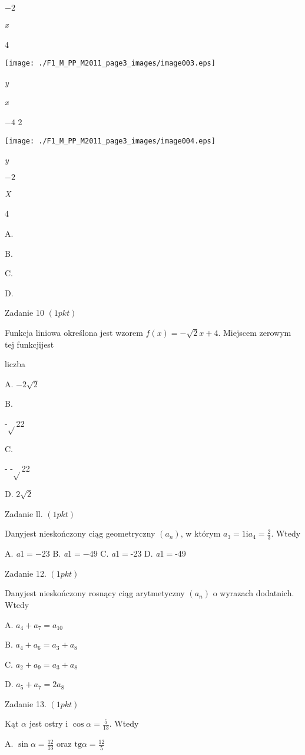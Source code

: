 \documentclass[a4paper,12pt]{article}
\begin{document}
$-2$

{\it x}

4
\begin{center}
\texttt{[image: ./F1\_M\_PP\_M2011\_page3\_images/image003.eps]}
\end{center}
{\it y}

{\it x}

$-4$  2
\begin{center}
\texttt{[image: ./F1\_M\_PP\_M2011\_page3\_images/image004.eps]}
\end{center}
{\it y}

$-2$

{\it X}

4

A.

B.

C.

D.

Zadanie 10 $(1pkt)$

Funkcja liniowa określona jest wzorem $f(x)=-\sqrt{2}x+4$. Miejscem zerowym tej funkcjijest

liczba

A. $-2\sqrt{2}$

B.

-$\sqrt{}$22

C.

- -$\sqrt{}$22

D. $2\sqrt{2}$

Zadanie ll. $(1pkt)$

Danyjest nieskończony ciąg geometryczny $(a_{n})$, w którym $a_{3}=1 \displaystyle \mathrm{i}a_{4}=\frac{2}{3}$. Wtedy

A. {\it a}1$=- 23$ B. {\it a}1$=- 49$ C. {\it a}1$=$-23 D. {\it a}1$=$-49

Zadanie 12. $(1pkt)$

Danyjest nieskończony rosnący ciąg arytmetyczny $(a_{n})$ o wyrazach dodatnich. Wtedy

A. $a_{4}+a_{7}=a_{10}$

B. $a_{4}+a_{6}=a_{3}+a_{8}$

C. $a_{2}+a_{9}=a_{3}+a_{8}$

D. $a_{5}+a_{7}=2a_{8}$

Zadanie 13. $(1pkt)$

Kąt $\alpha$ jest ostry i $\displaystyle \cos\alpha=\frac{5}{13}$. Wtedy

A. $\displaystyle \sin\alpha=\frac{12}{13}$ oraz $\displaystyle \mathrm{t}\mathrm{g}\alpha=\frac{12}{5}$
\end{document}
